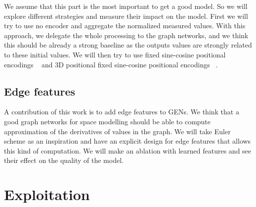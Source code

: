 \documentclass[a4paper,10pt]{article}
\newcommand{\ap}[1]{\marginpar{{\tiny \color{red} [AP] #1}}}
\begin{document}
We assume that this part is the most important to get a good model. So we will explore different strategies and measure their impact on the model. First we will try to use no encoder and aggregate the normalized measured values. With this approach, we delegate the whole processing to the graph networks, and we think this should be already a strong baseline as the outputs values are strongly related to these initial values. We will then try to use fixed sine-cosine positional encodings ~\cite{vaswani2017attention} and 3D positional fixed sine-cosine positional encodings ~\cite{chu2021conditional}.

\subsection{Edge features}
A contribution of this work is to add edge features to GENs. We think that a good graph networks for space modelling should be able to compute approximation of the derivatives of values in the graph. We will take Euler scheme as an inspiration and have an explicit design for edge features that allows this kind of computation. We will make an ablation with learned features and see their effect on the quality of the model.
\ap{TODO: sketch}



\section{Exploitation}

\end{document}
